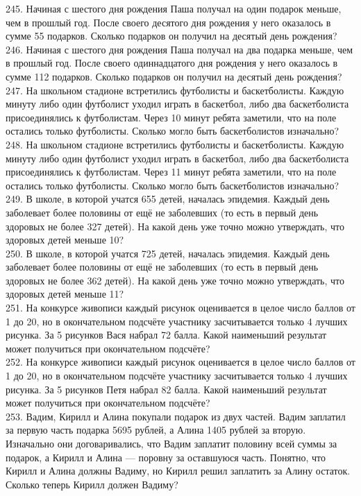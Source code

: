 245. Начиная с шестого дня рождения Паша получал на один подарок меньше, чем в прошлый год. После своего десятого дня рождения у него оказалось в сумме 55 подарков. Сколько подарков он получил на десятый день рождения?\\
246. Начиная с шестого дня рождения Паша получал на два подарка меньше, чем в прошлый год. После своего одиннадцатого дня рождения у него оказалось в сумме 112 подарков. Сколько подарков он получил на десятый день рождения?\\
247. На школьном стадионе встретились футболисты и баскетболисты. Каждую минуту либо один футболист уходил играть в баскетбол, либо два баскетболиста присоединялись к футболистам. Через 10 минут ребята заметили, что на поле остались только футболисты. Сколько могло быть баскетболистов изначально?\\
248. На школьном стадионе встретились футболисты и баскетболисты. Каждую минуту либо один футболист уходил играть в баскетбол, либо два баскетболиста присоединялись к футболистам. Через 11 минут ребята заметили, что на поле остались только футболисты. Сколько могло быть баскетболистов изначально?\\
249. В школе, в которой учатся 655 детей, началась эпидемия. Каждый день заболевает более половины от ещё не заболевших (то есть в первый день здоровых не более 327 детей). На какой день уже точно можно утверждать, что здоровых детей меньше 10?\\
250. В школе, в которой учатся 725 детей, началась эпидемия. Каждый день заболевает более половины от ещё не заболевших (то есть в первый день здоровых не более 362 детей). На какой день уже точно можно утверждать, что здоровых детей меньше 11?\\
251. На конкурсе живописи каждый рисунок оценивается в целое число баллов от 1 до 20, но в окончательном подсчёте участнику засчитывается только 4 лучших рисунка. За 5 рисунков Вася набрал 72 балла. Какой наименьший результат может получиться при окончательном подсчёте?\\
252. На конкурсе живописи каждый рисунок оценивается в целое число баллов от 1 до 20, но в окончательном подсчёте участнику засчитывается только 4 лучших рисунка. За 5 рисунков Петя набрал 82 балла. Какой наименьший результат может получиться при окончательном подсчёте?\\
253. Вадим, Кирилл и Алина покупали подарок из двух частей. Вадим заплатил за первую часть подарка 5695 рублей, а Алина 1405 рублей за вторую. Изначально они договаривались, что Вадим заплатит половину всей суммы за подарок, а Кирилл и Алина --- поровну за оставшуюся часть. Понятно, что Кирилл и Алина должны Вадиму, но Кирилл решил заплатить за Алину остаток. Сколько теперь Кирилл должен Вадиму?\\

